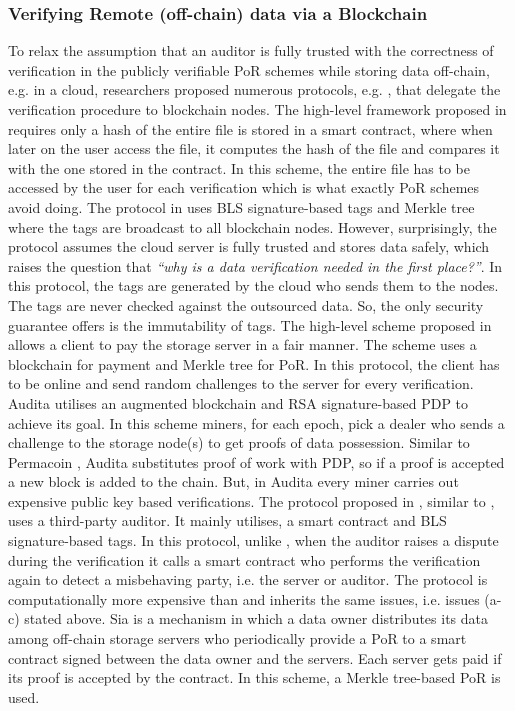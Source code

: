 \subsubsection{Verifying Remote (off-chain) data via a Blockchain}
 To relax the assumption that an auditor is fully trusted with the correctness of verification in the publicly verifiable PoR schemes while storing data off-chain, e.g. in a cloud, researchers proposed numerous protocols, e.g. \cite{RennerMK18,HaoXWJW18,ZhangDLZ18,Audita18,blockchain-data-audit-18,sia14}, that delegate the verification procedure  to blockchain nodes.  The high-level framework  proposed in \cite{RennerMK18} requires only a hash of the entire file is stored in a smart contract, where when later on the user access the file, it computes the hash of the file and compares it with the one stored in the contract. In this scheme, the entire file has to be accessed by the user for each verification which is what exactly PoR schemes avoid doing. The protocol  in \cite{HaoXWJW18} uses BLS signature-based tags and Merkle tree where the tags are broadcast to all blockchain nodes. However, surprisingly, the protocol assumes the cloud server is fully trusted and stores data safely, which raises the question that \textit{``why is a data verification needed in the first place?''}. In this protocol, the tags are generated by the cloud who sends them to the nodes. The tags are never checked against the outsourced data.  So, the only security guarantee \cite{HaoXWJW18} offers is the immutability of tags. The high-level scheme proposed in \cite{ZhangDLZ18} allows a client to pay the storage server in a fair manner. The scheme uses a blockchain for payment    and Merkle tree for PoR. In this protocol, the client has to be online and send random challenges to the server for every verification. 
 Audita  \cite{Audita18} utilises an augmented blockchain and RSA signature-based  PDP  \cite{DBLP:conf/ccs/AtenieseBCHKPS07} to achieve its goal. In this scheme miners, for each epoch, pick a dealer who sends a challenge to the storage node(s) to get  proofs of data possession. Similar to Permacoin \cite{MillerPermacoin}, Audita substitutes proof of work with PDP, so if a proof is accepted a new block is added to the chain. But, in Audita every miner carries out  expensive public key based verifications.  The protocol proposed in \cite{blockchain-data-audit-18},   similar to \cite{armknecht2014outsourced}, uses a third-party auditor. It mainly utilises, a smart contract and  BLS signature-based tags. In this protocol, unlike \cite{armknecht2014outsourced},  when the auditor raises a dispute during the verification it calls a smart contract who performs the verification again to detect a misbehaving party, i.e. the server or auditor.  The protocol is computationally more expensive than \cite{armknecht2014outsourced} and inherits the same  issues, i.e. issues (a-c) stated above.  Sia \cite{sia14} is a mechanism in which a data owner  distributes  its data among off-chain storage servers who periodically provide a PoR  to a smart contract signed between the data owner and the servers. Each server gets paid if its proof is accepted by the contract. In this scheme, a Merkle tree-based PoR is used. 
 
